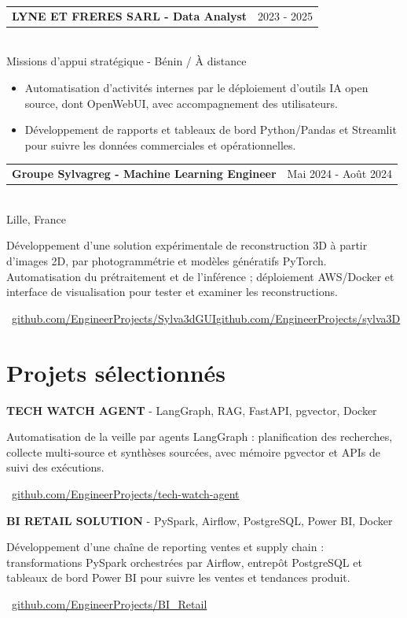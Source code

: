 \documentclass[10pt,a4paper]{article}
\makeatletter
\newcommand{\role}[3]{%
  \vspace{2.2pt}
  \begin{tabularx}{\linewidth}{@{}Xr@{}}
  \textbf{#1} & {\color{muted}#2}
  \end{tabularx}\vspace{0.8pt}\\
  {\color{muted}#3}\par
  \vspace{2pt}
}
\newcommand{\projectline}[2]{%
  \textbf{#1} - #2\par
}
\newcommand{\githublink}[2]{%
  \par{\footnotesize\color{accent}\faIcon{github}\ \href{#1}{#2}}\par
}
\newlength{\maincolumnheight}
\makeatother
\begin{document}
\begin{lrbox}{\maincolumnbox}
\begin{minipage}[t]{0.695\textwidth}
\vspace{4pt}
\role{LYNE ET FRERES SARL - Data Analyst}{2023 - 2025}{Missions d'appui stratégique - Bénin / À distance}
\begin{itemize}
  \item Automatisation d'activités internes par le déploiement d'outils IA open source, dont OpenWebUI, avec accompagnement des utilisateurs.
  \item Développement de rapports et tableaux de bord Python/Pandas et Streamlit pour suivre les données commerciales et opérationnelles.
\end{itemize}

\vspace{4pt}
\role{Groupe Sylvagreg - Machine Learning Engineer}{Mai 2024 - Août 2024}{Lille, France}
Développement d'une solution expérimentale de reconstruction 3D à partir d'images 2D, par photogrammétrie et modèles génératifs PyTorch. Automatisation du prétraitement et de l'inférence ; déploiement AWS/Docker et interface de visualisation pour tester et examiner les reconstructions.\par
{\fontsize{7.5pt}{9pt}\selectfont\color{accent}\ \href{https://github.com/EngineerProjects/Sylva3dGUI}{github.com/EngineerProjects/Sylva3dGUI}\enspace\textbullet\enspace\href{https://github.com/EngineerProjects/sylva3D}{github.com/EngineerProjects/sylva3D}}\par

\section{Projets sélectionnés}
\projectline{TECH WATCH AGENT}{LangGraph, RAG, FastAPI, pgvector, Docker}
Automatisation de la veille par agents LangGraph : planification des recherches, collecte multi-source et synthèses sourcées, avec mémoire pgvector et APIs de suivi des exécutions.
\githublink{https://github.com/EngineerProjects/tech-watch-agent}{github.com/EngineerProjects/tech-watch-agent}

\vspace{4pt}
\projectline{BI RETAIL SOLUTION}{PySpark, Airflow, PostgreSQL, Power BI, Docker}
Développement d'une chaîne de reporting ventes et supply chain : transformations PySpark orchestrées par Airflow, entrepôt PostgreSQL et tableaux de bord Power BI pour suivre les ventes et tendances produit.
\githublink{https://github.com/EngineerProjects/BI_Retail}{github.com/EngineerProjects/BI\_Retail}

\end{minipage}
\end{lrbox}
\setlength{\maincolumnheight}{\dimexpr\ht\maincolumnbox+\dp\maincolumnbox\relax}
\addtolength{\maincolumnheight}{40pt}
\end{document}
